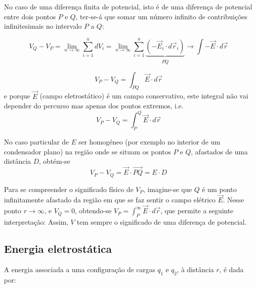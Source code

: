 \documentclass[a4paper,twoside,12pt]{article}      %
\begin{document}
No caso de uma diferença finita de potencial, isto é de uma diferença de potencial entre dois pontos $P$ e $Q$, ter-se-á que somar um número infinito de contribuições infinitesimais no intervalo $P$ a $Q$:

\begin{equation}
V_Q-V_P  = \lim_{n  \to \infty } \sum_{i=1}^n dV_i = \lim_{n \to \infty } \sum_{i=1}^n \underbrace{( - \vec{E}_i \cdot d\vec{r}_i )}_{\bar{PQ}} \rightarrow \int - \vec{E} \cdot d\vec{r}
\end{equation}

\begin{equation*} 
V_P - V_Q  = \int_{\bar{PQ}}  \vec{E} \cdot d \vec{r}
\end{equation*}
e porque $\vec{E}$ (campo eletrostático) é um campo conservativo, este integral não vai depender do percurso mas apenas dos pontos extremos, i.e.
\begin{equation*} 
V_P - V_Q  = \int_P^Q  \vec{E} \cdot d\vec{r}
\end{equation*}


No caso particular de $E$ ser homogéneo (por exemplo no interior de um condensador plano)  na região onde se situam os pontos $P$ e $Q$, afastados de uma distância $D$, obtém-se 
\begin{equation}\label{eq:difPot}
V_P - V_Q  =  \vec{E}\cdot\vec{PQ}=E\cdot D
\end{equation}

Para se compreender o significado físico de $V_P$, imagine-se que $Q$ é um ponto infinitamente
afastado da região em que se faz sentir o campo elétrico $\vec{E}$.
Nesse ponto $r \to \infty $, e $V_Q=0$,
obtendo-se $V_P =  \int_P^\infty  \vec{E} \cdot d\vec{r}$, que permite a seguinte interpretação:
\newline
\newline
{}
\newline
\newline
Assim, $V$ tem sempre o significado de uma diferença de potencial.

\subsection{{\sf Energia eletrostática}}
A energia associada a uma configuração de cargas $q_1$ e $q_2$, à distância $r$, é dada por:
\end{document}
